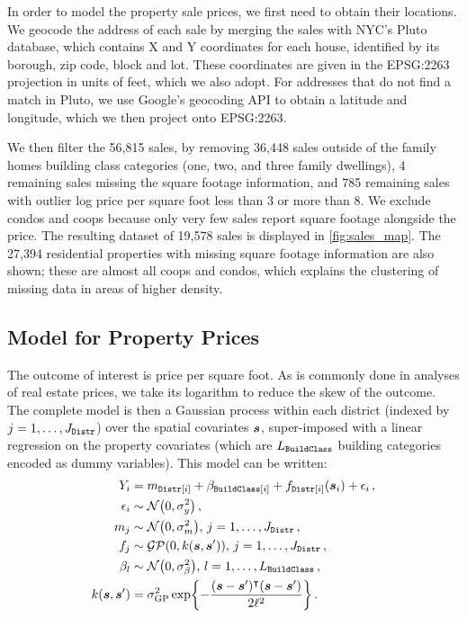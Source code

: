 In order to model the property sale prices, we first need to obtain their locations.
We geocode the address of each sale by merging the sales with NYC's Pluto database, which contains X and Y coordinates for each house, identified by its borough, zip code, block and lot.
These coordinates are given in the EPSG:2263 projection in units of feet, which we also adopt.
For addresses that do not find a match in Pluto, we use Google's geocoding API to obtain a latitude and longitude, which we then project onto EPSG:2263.

We then filter the 56,815 sales, by removing
36,448 sales outside of the family homes building class categories (one, two, and three family dwellings),
4 remaining sales missing the square footage information,
and 785 remaining sales with outlier log price per square foot less than 3 or more than 8.
We exclude condos and coops because only very few sales report square footage alongside the price.
The resulting dataset of 19,578 sales is displayed in \autoref{fig:sales_map}.
The 27,394 residential properties with missing square footage information are also shown;
these are almost all coops and condos, which explains the clustering of missing data in areas of higher density.

\subsection{Model for Property Prices}
The outcome of interest is price per square foot.
As is commonly done in analyses of real estate prices, we take its logarithm to reduce the skew of the outcome.
The complete model is then a Gaussian process within each district (indexed by \(j=1,\dotsc,J_{\mathtt{Distr}}\)) over the spatial covariates \(\bm{s}\), super-imposed with a linear regression on the property covariates (which are \(L_{\mathtt{BuildClass}}\) building categories encoded as dummy variables).
This model can be written:
\begin{equation}
    \begin{split}
        Y_i &= %
        m_{\district\sbr{i}} + \beta_{\building\sbr{i}}
        + f_{\district\sbr{i}}(\svec_i) + \epsilon_i \,,
        \\
        \epsilon_i &\sim \normal\del{0, \sigma_y^2} \,, \\
        m_{j} &\sim \normal\del{0, \sigmamu^2},\,j=1,\dotsc,J_\district \,, \\
        f_j &\sim \GP\del{0, k(\svec, \svec')},\,j=1,\dotsc,J_\district \,, \\
        \beta_{l} &\sim \normal\del{0, \sigma_\beta^2},\,l=1,\dotsc,L_\building \,, \\
        k(\svec, \svec') &= \sigmaf^2 \exp\cbr{ - \frac{(\svec-\svec')\trans(\svec-\svec')}{2\ell^2}} \,.
    \end{split}
    \label{eq:nyc_model}
\end{equation}

